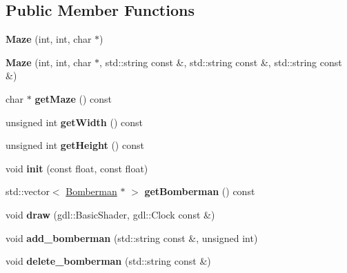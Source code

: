 \subsection*{Public Member Functions}
\begin{DoxyCompactItemize}
\item 
\hypertarget{class_maze_a2d3de4f1c41b0cb56522e9d39d4e9fab}{}{\bfseries Maze} (int, int, char $\ast$)\label{class_maze_a2d3de4f1c41b0cb56522e9d39d4e9fab}

\item 
\hypertarget{class_maze_a08cd21c604940c6f12e39951b4903a44}{}{\bfseries Maze} (int, int, char $\ast$, std\+::string const \&, std\+::string const \&, std\+::string const \&)\label{class_maze_a08cd21c604940c6f12e39951b4903a44}

\item 
\hypertarget{class_maze_a353ecd5799f5133657893303aac0e538}{}char $\ast$ {\bfseries get\+Maze} () const \label{class_maze_a353ecd5799f5133657893303aac0e538}

\item 
\hypertarget{class_maze_ab835098f126bd3e757c2ed9c0817daf1}{}unsigned int {\bfseries get\+Width} () const \label{class_maze_ab835098f126bd3e757c2ed9c0817daf1}

\item 
\hypertarget{class_maze_ae3b320f60148ca5dc2708ffa1e72815f}{}unsigned int {\bfseries get\+Height} () const \label{class_maze_ae3b320f60148ca5dc2708ffa1e72815f}

\item 
\hypertarget{class_maze_a0bd55925dc2862a4b0443be3694ba1b5}{}void {\bfseries init} (const float, const float)\label{class_maze_a0bd55925dc2862a4b0443be3694ba1b5}

\item 
\hypertarget{class_maze_a62d204fa434b411807c8148468a9e794}{}std\+::vector$<$ \hyperlink{class_bomberman}{Bomberman} $\ast$ $>$ {\bfseries get\+Bomberman} () const \label{class_maze_a62d204fa434b411807c8148468a9e794}

\item 
\hypertarget{class_maze_aee76a4834a3c048b69fed7f01a82ba3a}{}void {\bfseries draw} (gdl\+::\+Basic\+Shader, gdl\+::\+Clock const \&)\label{class_maze_aee76a4834a3c048b69fed7f01a82ba3a}

\item 
\hypertarget{class_maze_a4f0f7b9063f7b1729b64470b684b365c}{}void {\bfseries add\+\_\+bomberman} (std\+::string const \&, unsigned int)\label{class_maze_a4f0f7b9063f7b1729b64470b684b365c}

\item 
\hypertarget{class_maze_a8d32cdf4822671019c15ed9de32e63df}{}void {\bfseries delete\+\_\+bomberman} (std\+::string const \&)\label{class_maze_a8d32cdf4822671019c15ed9de32e63df}

\end{DoxyCompactItemize}
